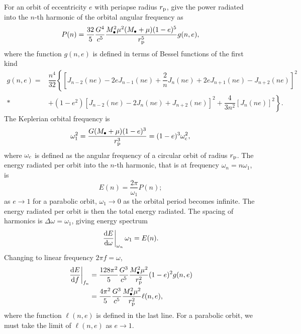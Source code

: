 For an orbit of eccentricity $e$ with periapse radius $r_\mathrm{p}$, \citet{Peters1963} give the power radiated into the $n$-th harmonic of the orbital angular frequency as
\begin{equation}
P(n) = \dfrac{32}{5}\dfrac{G^4}{c^5}\dfrac{M_\bullet^2\mu^2(M_\bullet + \mu)(1-e)^5}{r_\mathrm{p}^5}g(n,e),
\label{eq:PM_P}
\end{equation}
where the function $g(n,e)$ is defined in terms of Bessel functions of the first kind
\begin{align}
g(n,e) = {} & \dfrac{n^4}{32}\left\{\left[J_{n-2}(ne) - 2eJ_{n-1}(ne) + \dfrac{2}{n}J_n(ne) + 2eJ_{n+1}(ne) - J_{n+2}(ne)\right]^2 \right. \nonumber \\*
 & + \left. \left(1 - e^2\right)\left[J_{n-2}(ne) - 2J_n(ne) + J_{n+2}(ne)\right]^2 + \dfrac{4}{3n^2}\left[J_n(ne)\right]^2\right\}.
\end{align}
The Keplerian orbital frequency is
\begin{equation}
\omega_1^2 = \dfrac{G(M_\bullet + \mu)(1 - e)^3}{r_\mathrm{p}^3} = (1 - e)^3\omega_\mathrm{c}^2,
\label{eq:Kepler_freq}
\end{equation}
where $\omega_\mathrm{c}$ is defined as the angular frequency of a circular orbit of radius $r_\mathrm{p}$. The energy radiated per orbit into the $n$-th harmonic, that is at frequency $\omega_n = n\omega_1$, is
\begin{equation}
E(n) = \dfrac{2\pi}{\omega_1}P(n);
\label{eq:E(n)}
\end{equation}
as $e \rightarrow 1$ for a parabolic orbit, $\omega_1 \rightarrow 0$ as the orbital period becomes infinite. The energy radiated per orbit is then the total energy radiated. The spacing of harmonics is $\Delta\omega = \omega_1$, giving energy spectrum
\begin{equation}
\left.\dfrac{\mathrm{d} {E}}{\mathrm{d} {\omega}}\right|_{\omega_n}\omega_1 = E(n).
\end{equation}
Changing to linear frequency $2\pi f = \omega$,
\begin{align}
\left.\dfrac{\mathrm{d} {E}}{\mathrm{d} {f}}\right|_{f_n}  = {} & \dfrac{128\pi^2}{5}\dfrac{G^3}{c^5}\dfrac{M_\bullet^2\mu^2}{r_\mathrm{p}^2}(1-e)^2g(n,e) \\*
  = {} & \dfrac{4\pi^2}{5}\dfrac{G^3}{c^5}\dfrac{M_\bullet^2\mu^2}{r_\mathrm{p}^2}\ell(n,e),
\label{eq:PM_spectrum}
\end{align}
where the function $\ell(n,e)$ is defined in the last line. For a parabolic orbit, we must take the limit of $\ell(n,e)$ as $e \rightarrow 1$.

